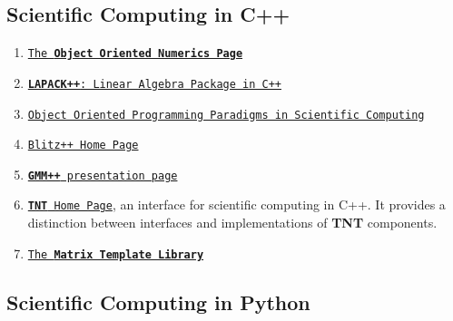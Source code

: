 \hypertarget{scientificComputing_scc}{}\subsection{Scientific Computing in C++}\label{scientificComputing_scc}
\begin{enumerate}
\item \href{http://oonumerics.org/oon}{\tt The {\bf Object Oriented Numerics Page}}\item \href{http://gams.nist.gov/lapack++/}{\tt {\bf LAPACK++}: Linear Algebra Package in C++}\item \href{http://www-hpc.jpl.nasa.gov/PEP/nortonc/thesis.html}{\tt Object Oriented Programming Paradigms in Scientific Computing}\item \href{http://www.oonumerics.org/blitz/}{\tt Blitz++ Home Page}\item \href{http://www.gmm.insa-tlse.fr/getfem/gmm.html}{\tt {\bf GMM++} presentation page}\item \href{http://gams.nist.gov/tnt/}{\tt {\bf TNT} Home Page}, an interface for scientific computing in C++. It provides a distinction between interfaces and implementations of {\bf TNT} components.\item \href{http://www.osl.iu.edu/research/mtl/}{\tt The {\bf Matrix Template Library}}\end{enumerate}
\hypertarget{scientificComputing_scp}{}\subsection{Scientific Computing in Python}\label{scientificComputing_scp}
